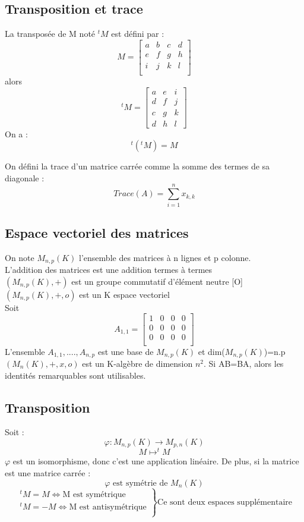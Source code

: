 \subsection{Transposition et trace}
\begin{de}
La transposée de M noté $^{t}M$ est défini par :
$$M=\begin{bmatrix}
a & b & c & d\\
e & f & g & h  \\
i & j & k & l \\
\end{bmatrix}$$
alors
$$^{t}M=\begin{bmatrix}
a & e & i \\
d & f & j  \\
c & g & k  \\
d & h & l 
\end{bmatrix}$$
On a : 
$$^{t}(^{t}M) = M $$
\end{de}
\begin{de}
On défini la trace d'un matrice carrée comme la somme des termes de sa diagonale :
$$Trace(A) = \sum_{i=1}^nx_{k,k}$$
\end{de}
\subsection{Espace vectoriel des matrices}
On note $M_{n,p}(K)$ l'ensemble des matrices à n lignes et p colonne. \\
L'addition des matrices est une addition termes à termes \\
$(M_{n,p}(K),+)$ est un groupe commutatif d'élément neutre [O] \\
$(M_{n,p}(K),+,o)$ est un K espace vectoriel \\
Soit $$A_{1,1} = \begin{bmatrix}
1 & 0 & 0 & 0\\
0 & 0 & 0 & 0\\
0 & 0 & 0 & 0\\
\end{bmatrix}$$
L'ensemble {$A_{1,1},....,A_{n,p}$} est une base de $M_{n,p}(K)$ et dim($M_{n,p}(K)$)=n.p\\
$(M_n(K),+,x,o)$ est un K-algèbre de dimension $n^2$. Si AB=BA, alors les identités remarquables sont utilisables.
\subsection{Transposition}
\begin{de}
 Soit :
$$\varphi : M_{n,p}(K) \rightarrow M_{p,n}(K)$$
$$M \mapsto ^tM$$
$\varphi$ est un isomorphisme, donc c'est une application linéaire.
De plus, si la matrice est une matrice carrée :
$$\varphi \mbox{ est symétrie de }M_n(K)$$
\[\left.\begin{array}{l}
   ^tM=M \Leftrightarrow \mbox{M est symétrique}\\
    ^tM=-M \Leftrightarrow \mbox{M est antisymétrique} \\
  \end{array}\right\}
\mbox{Ce sont deux espaces supplémentaire}\]
\end{de}
